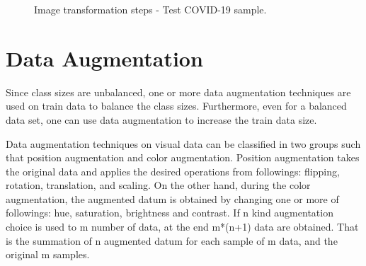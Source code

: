 \begin{figure}[h]
	\centering
	\caption{Image transformation steps - Test COVID-19 sample.}
	\label{fig:data_transform_steps}
\end{figure}

\section{Data Augmentation}

Since class sizes are unbalanced, one or more data augmentation techniques are used on train data to balance the class sizes. Furthermore, even for a balanced data set, one can use data augmentation to increase the train data size.

Data augmentation techniques on visual data can be classified in two groups such that position augmentation and color augmentation. Position augmentation takes the original data and applies the desired operations from followings: flipping, rotation, translation, and scaling. On the other hand, during the color augmentation, the augmented datum is obtained by changing one or more of followings: hue, saturation, brightness and contrast. If n kind augmentation choice is used to m number of data, at the end m*(n+1) data are obtained. That is the summation of n augmented datum for each sample of m data, and the original m samples.


